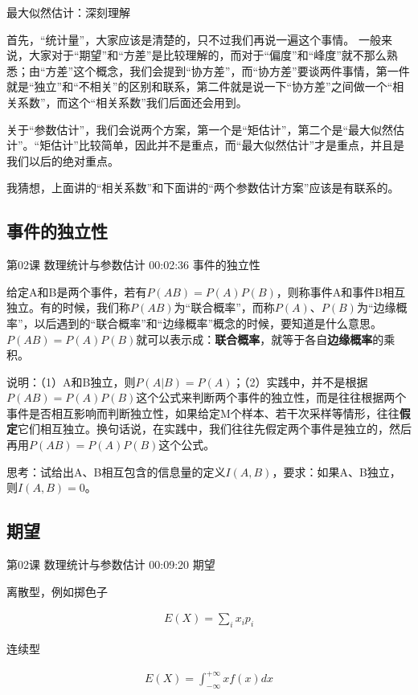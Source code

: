 \documentclass[UTF8]{ctexart}
\begin{document}
最大似然估计：深刻理解

首先，“统计量”，大家应该是清楚的，只不过我们再说一遍这个事情。 一般来说，大家对于“期望”和“方差”是比较理解的，而对于“偏度”和“峰度”就不那么熟悉；由“方差”这个概念，我们会提到“协方差”，而“协方差”要谈两件事情，第一件就是“独立”和“不相关”的区别和联系，第二件就是说一下“协方差”之间做一个“相关系数”，而这个“相关系数”我们后面还会用到。

关于“参数估计”，我们会说两个方案，第一个是“矩估计”，第二个是“最大似然估计”。“矩估计”比较简单，因此并不是重点，而“最大似然估计”才是重点，并且是我们以后的绝对重点。

我猜想，上面讲的“相关系数”和下面讲的“两个参数估计方案”应该是有联系的。

\subsection{事件的独立性}

第02课 数理统计与参数估计 00:02:36 事件的独立性

给定A和B是两个事件，若有$P(AB)=P(A)P(B)$，则称事件A和事件B相互独立。有的时候，我们称$P(AB)$为“联合概率”，而称$P(A)$、$P(B)$为“边缘概率”，以后遇到的“联合概率”和“边缘概率”概念的时候，要知道是什么意思。$P(AB)=P(A)P(B)$就可以表示成：\textbf{联合概率}，就等于各自\textbf{边缘概率}的乘积。

说明：（1）A和B独立，则$P(A|B)=P(A)$；（2）实践中，并不是根据$P(AB)=P(A)P(B)$这个公式来判断两个事件的独立性，而是往往根据两个事件是否相互影响而判断独立性，如果给定M个样本、若干次采样等情形，往往\textbf{假定}它们相互独立。换句话说，在实践中，我们往往先假定两个事件是独立的，然后再用$P(AB)=P(A)P(B)$这个公式。

思考：试给出A、B相互包含的信息量的定义$I(A,B)$，要求：如果A、B独立，则$I(A,B)=0$。

\subsection{期望}

第02课 数理统计与参数估计 00:09:20 期望

离散型，例如掷色子

\begin{equation}
\begin{aligned}
E(X)=\sum_{i}x_{i}p_{i}
\end{aligned}
\end{equation}

连续型

\begin{equation}
\begin{aligned}
E(X)=\int_{-\infty}^{+\infty} x f(x) dx
\end{aligned}
\end{equation}
\end{document}
